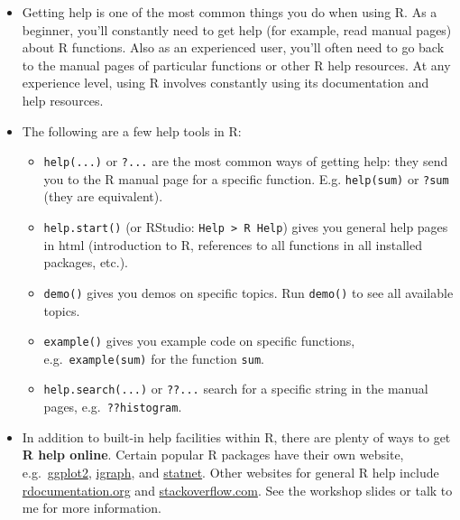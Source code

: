 \documentclass[
]{book}
\providecommand{\tightlist}{%
  \setlength{\itemsep}{0pt}\setlength{\parskip}{0pt}}
\begin{document}
\begin{itemize}
\tightlist
\item
  Getting help is one of the most common things you do when using R. As a beginner, you'll constantly need to get help (for example, read manual pages) about R functions. Also as an experienced user, you'll often need to go back to the manual pages of particular functions or other R help resources. At any experience level, using R involves constantly using its documentation and help resources.
\item
  The following are a few help tools in R:

  \begin{itemize}
  \tightlist
  \item
    \texttt{help(...)} or \texttt{?...} are the most common ways of getting help: they send you to the R manual page for a specific function. E.g. \texttt{help(sum)} or \texttt{?sum} (they are equivalent).
  \item
    \texttt{help.start()} (or RStudio: \texttt{Help\ \textgreater{}\ R\ Help}) gives you general help pages in html (introduction to R, references to all functions in all installed packages, etc.).
  \item
    \texttt{demo()} gives you demos on specific topics. Run \texttt{demo()} to see all available topics.
  \item
    \texttt{example()} gives you example code on specific functions, e.g.~\texttt{example(sum)} for the function \texttt{sum}.\\
  \item
    \texttt{help.search(...)} or \texttt{??...} search for a specific string in the manual pages, e.g.~\texttt{??histogram}.
  \end{itemize}
\item
  In addition to built-in help facilities within R, there are plenty of ways to get \textbf{R help online}. Certain popular R packages have their own website, e.g.~\href{http://ggplot2.tidyverse.org/}{ggplot2}, \href{http://igraph.org/}{igraph}, and \href{http://www.statnet.org/}{statnet}. Other websites for general R help include \href{http://www.rdocumentation.org/}{rdocumentation.org} and \href{http://stackoverflow.com/}{stackoverflow.com}. See the workshop slides or talk to me for more information.
\end{itemize}
\end{document}
